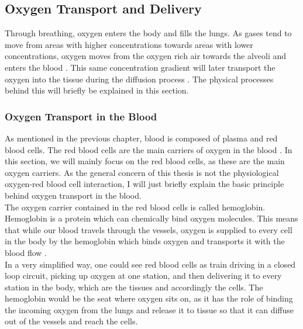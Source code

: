 \newpage
\subsection{Oxygen Transport and Delivery}

Through breathing, oxygen enters the body and fills the lungs. As gases tend to move from areas with higher concentrations towards areas with lower concentrations, oxygen moves from the oxygen rich air towards the alveoli and enters the blood \cite{bukwirwa}. This same concentration gradient will later transport the oxygen into the tissue during the diffusion process \cite{pittman2011regulation}. The physical processes behind this will briefly be explained in this section.

\subsubsection*{Oxygen Transport in the Blood}

As mentioned in the previous chapter, blood is composed of plasma and red blood cells. The red blood cells are the main carriers of oxygen in the blood \cite{pittman2011regulation}. In this section, we will mainly focus on the red blood cells, as these are the main oxygen carriers. As the general concern of this thesis is not the physiological oxygen-red blood cell interaction, I will just briefly explain the basic principle behind oxygen transport in the blood.
\\The oxygen carrier contained in the red blood cells is called hemoglobin. Hemoglobin is a protein which can chemically bind oxygen molecules. This means that while our blood travels through the vessels, oxygen is supplied to every cell in the body by the hemoglobin which binds oxygen and transports it with the blood flow \cite{hellums1977resistance}.
\\In a very simplified way, one could see red blood cells as train driving in a closed loop circuit, picking up oxygen at one station, and then delivering it to every station in the body, which are the tissues and accordingly the cells. The hemoglobin would be the seat where oxygen sits on, as it has the role of binding the incoming oxygen from the lungs and release it to tissue so that it can diffuse out of the vessels and reach the cells.

